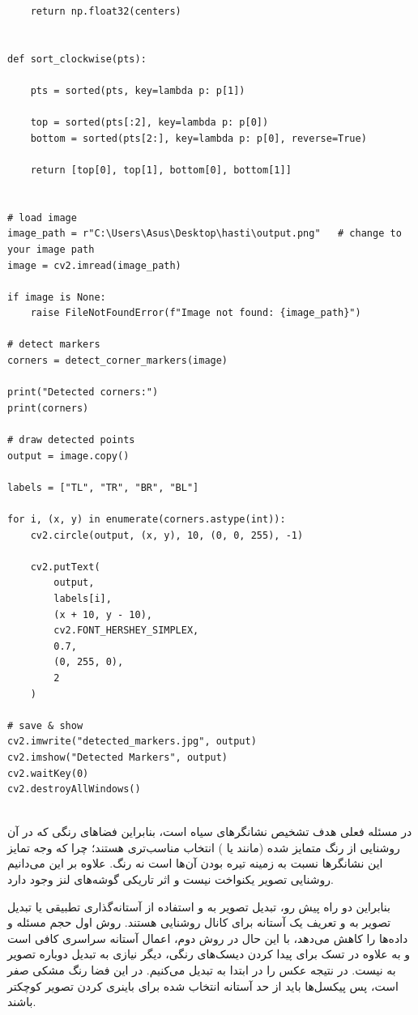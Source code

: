 \documentclass{article}
\begin{document}
\begin{latin}
\begin{LTR}
\begin{verbatim}
    return np.float32(centers)


def sort_clockwise(pts):
  
    pts = sorted(pts, key=lambda p: p[1])

    top = sorted(pts[:2], key=lambda p: p[0])
    bottom = sorted(pts[2:], key=lambda p: p[0], reverse=True)

    return [top[0], top[1], bottom[0], bottom[1]]


# load image
image_path = r"C:\Users\Asus\Desktop\hasti\output.png"   # change to your image path
image = cv2.imread(image_path)

if image is None:
    raise FileNotFoundError(f"Image not found: {image_path}")

# detect markers
corners = detect_corner_markers(image)

print("Detected corners:")
print(corners)

# draw detected points
output = image.copy()

labels = ["TL", "TR", "BR", "BL"]

for i, (x, y) in enumerate(corners.astype(int)):
    cv2.circle(output, (x, y), 10, (0, 0, 255), -1)

    cv2.putText(
        output,
        labels[i],
        (x + 10, y - 10),
        cv2.FONT_HERSHEY_SIMPLEX,
        0.7,
        (0, 255, 0),
        2
    )

# save & show
cv2.imwrite("detected_markers.jpg", output)
cv2.imshow("Detected Markers", output)
cv2.waitKey(0)
cv2.destroyAllWindows()


\end{verbatim}
\end{LTR}
\end{latin}

در مسئله فعلی هدف تشخیص نشانگرهای سیاه است، بنابراین فضاهای رنگی که در آن روشنایی از رنگ متمایز شده (مانند  یا ) انتخاب مناسب‌تری هستند؛ چرا که وجه تمایز این نشانگرها نسبت به زمینه تیره بودن آن‌ها است نه رنگ. علاوه بر این می‌دانیم روشنایی تصویر یکنواخت نیست و اثر تاریکی گوشه‌های لنز وجود دارد.

بنابراین دو راه پیش رو، تبدیل تصویر به  و استفاده از آستانه‌گذاری تطبیقی یا تبدیل تصویر به  و تعریف یک آستانه برای کانال روشنایی  هستند. روش اول حجم مسئله و داده‌ها را کاهش می‌دهد، با این حال در روش دوم، اعمال آستانه سراسری کافی است و به علاوه در تسک  برای پیدا کردن دیسک‌های رنگی، دیگر نیازی به تبدیل دوباره تصویر به  نیست. در نتیجه عکس را در ابتدا به  تبدیل می‌کنیم. در این فضا  رنگ مشکی صفر است، پس  پیکسل‌ها باید از حد آستانه انتخاب شده برای باینری کردن  تصویر کوچکتر باشند.
\end{document}
